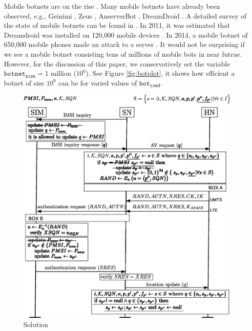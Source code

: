 \documentclass{llncs} %
\begin{document}
Mobile botnets are on the rise \cite{botnet_ccs09_symbian,botnet_usenix11,botnet_australia_2016}. Many mobile botnets have already been observed, e.g., Geinimi \cite{botnet_geinimi10}, Zeus \cite{botnet_zeus11}, AnserverBot \cite{botnet_anserverbot}, DreamDroid \cite{botnet_dreamdroid11}. A detailed survey of the state of mobile botnets can be found in \cite{botnet_threat15}. In 2011, it was estimated that Dreamdroid was installed on 120,000 mobile devices \cite{botnet_dreamdroid11}. In 2014, a mobile botnet of 650,000 mobile phones made an attack to a server \cite{chinese_spam}. It would not be surprising if we see a mobile botnet consisting tens of millions of mobile bots in near futrue. However, for the discussion of this paper, we conservatively set the variable $\texttt{botnet}_{\texttt{size}} = 1$ million ($10^6$). See Figure \ref{fig:botplot}, it shows how efficient a botnet of size $10^6$ can be for varied values of $\texttt{bot}_{\texttt{load}}$.

\begin{figure}[]
  \centering
    \includegraphics[width=\textwidth]{solution.eps}
  \caption{Solution}
  \label{fig:solution}	
\end{figure}
\end{document}
